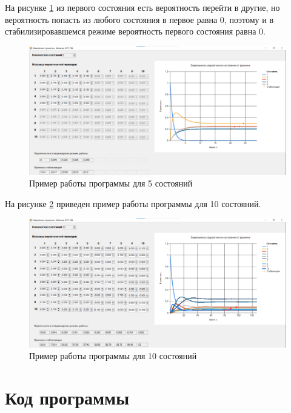 \documentclass[14pt, a4paper]{extarticle}
\begin{document}
\newpage
На рисунке \ref{pic:3} из первого состояния есть вероятность перейти в другие, но вероятность попасть из любого состояния в первое равна 0, поэтому и в стабилизировавшемся режиме вероятность первого состояния равна 0.
\begin{figure}[h]
	\begin{center}
		{\includegraphics[scale=0.45]{pictures/3.png}
			\caption{Пример работы программы для 5 состояний}
			\label{pic:3}}
	\end{center}
\end{figure}

\newpage
На рисунке \ref{pic:4} приведен пример работы программы для 10 состояний.
\begin{figure}[h]
	\begin{center}
		{\includegraphics[scale=0.45]{pictures/4.png}
			\caption{Пример работы программы для 10 состояний}
			\label{pic:4}}
	\end{center}
\end{figure}



\section{Код программы}
\end{document}
